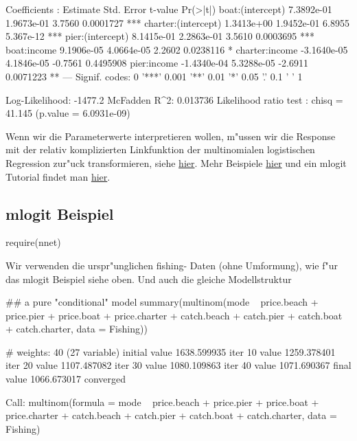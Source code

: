 \documentclass[a4paper,twoside]{tufte-book}\usepackage[]{graphicx}\usepackage[]{color}
\begin{document}
\begin{appendices}
\begin{Schunk}
\begin{Soutput}
Coefficients :
                       Estimate  Std. Error t-value  Pr(>|t|)    
boat:(intercept)     7.3892e-01  1.9673e-01  3.7560 0.0001727 ***
charter:(intercept)  1.3413e+00  1.9452e-01  6.8955 5.367e-12 ***
pier:(intercept)     8.1415e-01  2.2863e-01  3.5610 0.0003695 ***
boat:income          9.1906e-05  4.0664e-05  2.2602 0.0238116 *  
charter:income      -3.1640e-05  4.1846e-05 -0.7561 0.4495908    
pier:income         -1.4340e-04  5.3288e-05 -2.6911 0.0071223 ** 
---
Signif. codes:  0 '***' 0.001 '**' 0.01 '*' 0.05 '.' 0.1 ' ' 1

Log-Likelihood: -1477.2
McFadden R^2:  0.013736 
Likelihood ratio test : chisq = 41.145 (p.value = 6.0931e-09)
\end{Soutput}
\end{Schunk}

Wenn wir die Parameterwerte interpretieren wollen, m"ussen wir die Response mit der relativ komplizierten Linkfunktion der multinomialen logistischen Regression zur"uck transformieren, siehe \href{http://en.wikipedia.org/wiki/Multinomial_logistic_regression}{hier}. Mehr Beispiele \href{http://www.inside-r.org/packages/cran/mlogit/docs/suml}{hier} und ein mlogit Tutorial findet man \href{http://cran.r-project.org/web/packages/mlogit/vignettes/Exercises.pdf}{hier}.

\subsection{mlogit Beispiel}

\begin{Schunk}
\begin{Sinput}
require(nnet)
\end{Sinput}
\end{Schunk}

Wir verwenden die urspr"unglichen fishing- Daten (ohne Umformung), wie f"ur das mlogit Beispiel siehe oben.
Und auch die gleiche Modellstruktur

\begin{Schunk}
\begin{Sinput}
## a pure "conditional" model
summary(multinom(mode ~ price.beach + price.pier + price.boat + price.charter + 
                   catch.beach + catch.pier + catch.boat + catch.charter, data = Fishing))
\end{Sinput}
\begin{Soutput}
# weights:  40 (27 variable)
initial  value 1638.599935 
iter  10 value 1259.378401
iter  20 value 1107.487082
iter  30 value 1080.109863
iter  40 value 1071.690367
final  value 1066.673017 
converged
\end{Soutput}
\begin{Soutput}
Call:
multinom(formula = mode ~ price.beach + price.pier + price.boat + 
    price.charter + catch.beach + catch.pier + catch.boat + catch.charter, 
    data = Fishing)


\end{Soutput}
\end{Schunk}
\end{appendices}
\end{document}
